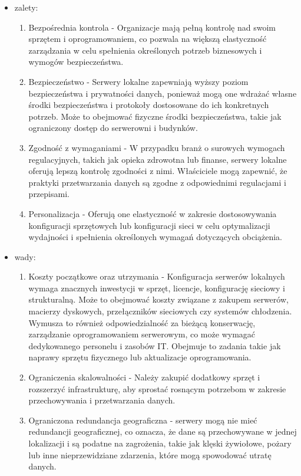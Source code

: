 \documentclass[12pt,a4paper,twoside]{article}
\begin{document}
\begin{itemize}
	\item zalety:
		\begin{enumerate}
			\item Bezpośrednia kontrola - Organizacje mają pełną kontrolę nad swoim sprzętem i oprogramowaniem, co pozwala na większą elastyczność zarządzania w celu spełnienia określonych potrzeb biznesowych i wymogów bezpieczeństwa.
			\item Bezpieczeństwo - Serwery lokalne zapewniają  wyższy poziom bezpieczeństwa i prywatności danych, ponieważ mogą one wdrażać własne środki bezpieczeństwa i protokoły dostosowane do ich konkretnych potrzeb. Może to obejmować fizyczne środki bezpieczeństwa, takie jak ograniczony dostęp do serwerowni i budynków.
			\item Zgodność z wymaganiami - W przypadku branż o surowych wymogach regulacyjnych, takich jak opieka zdrowotna lub finanse, serwery lokalne oferują lepszą kontrolę zgodności z nimi. Właściciele mogą zapewnić, że praktyki przetwarzania danych są zgodne z odpowiednimi regulacjami i przepisami.
			\item Personalizacja - Oferują one elastyczność w zakresie dostosowywania konfiguracji sprzętowych lub konfiguracji sieci w celu optymalizacji wydajności i spełnienia określonych wymagań dotyczących obciążenia.\\
		\end{enumerate}
	\item wady:
		\begin{enumerate}
			\item Koszty początkowe oraz utrzymania - Konfiguracja serwerów lokalnych wymaga znacznych inwestycji w sprzęt, licencje, konfigurację sieciowy i strukturalną. Może to obejmować koszty związane z zakupem serwerów, macierzy dyskowych, przełączników sieciowych czy systemów chłodzenia. Wymusza to również odpowiedzialność za bieżącą konserwację, zarządzanie oprogramowaniem serwerowym, co może wymagać dedykowanego personelu i zasobów IT. Obejmuje to zadania takie jak naprawy sprzętu fizycznego lub aktualizacje oprogramowania.
			\item Ograniczenia skalowalności - Należy zakupić dodatkowy sprzęt i rozszerzyć infrastrukturę, aby sprostać rosnącym potrzebom w zakresie przechowywania i przetwarzania danych. 
			\item Ograniczona redundancja geograficzna - serwery mogą nie mieć redundancji geograficznej, co oznacza, że dane są przechowywane w jednej lokalizacji i są podatne na zagrożenia, takie jak klęski żywiołowe, pożary lub inne nieprzewidziane zdarzenia, które mogą spowodować utratę danych.
		\end{enumerate}
\end{itemize}\par
\end{document}
